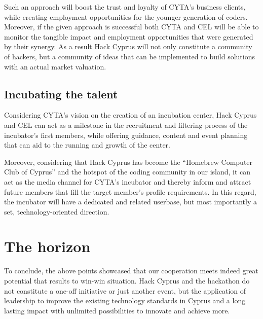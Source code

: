 \documentclass[a4paper,11pt]{report}
\begin{document}
Such an approach will boost the trust and loyalty of CYTA’s business clients, while creating employment opportunities for the younger generation of coders. Moreover, if the given approach is successful both CYTA and CEL will be able to monitor the tangible impact and employment opportunities that were generated by their synergy. As a result Hack Cyprus will not only constitute a community of hackers, but a community of ideas that can be implemented to build solutions with an actual market valuation.

\subsection{Incubating the talent}
Considering CYTA’s vision on the creation of an incubation center, Hack Cyprus and CEL can act as a milestone in the recruitment and filtering process of the incubator’s first members, while offering guidance, content and event planning that can aid to the running and growth of the center.

Moreover, considering that Hack Cyprus has become the “Homebrew Computer Club of Cyprus” and the hotspot of the coding community in our island, it can act as the media channel for CYTA’s incubator and thereby inform and attract future members that fill the target member’s profile requirements. In this regard, the incubator will have a dedicated and related userbase, but most importantly a set, technology-oriented direction.

\section{The horizon}
To conclude, the above points showcased that our cooperation meets indeed great potential that results to win-win situation. Hack Cyprus and the hackathon do not constitute a one-off initiative or just another event, but the application of leadership to improve the existing technology standards in Cyprus and a long lasting impact with unlimited possibilities to innovate and achieve more.
\end{document}
